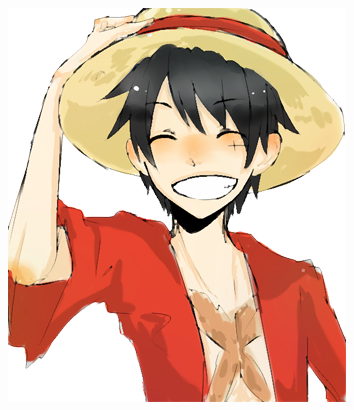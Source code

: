 \begin{figure}[htb!]
\centering
\begin{subfigure}{0.24\textwidth}
\includegraphics[width=\textwidth]{images/rufy_d.png}
\end{subfigure}
\begin{subfigure}{0.24\textwidth}

\end{subfigure}
\end{figure}
